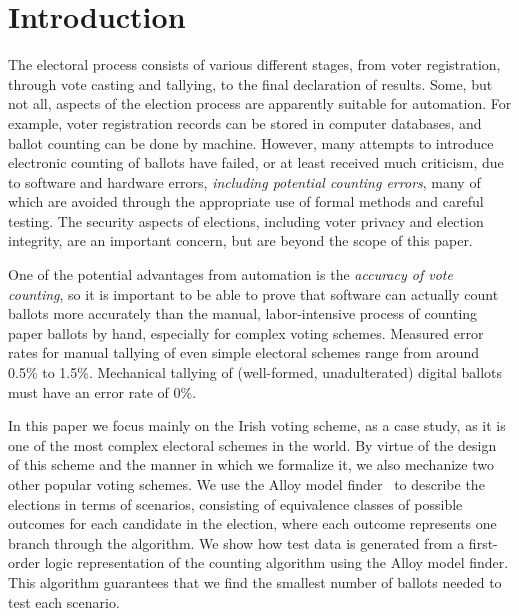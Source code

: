 \documentclass[runningheads,a4paper]{llncs}
\begin{document}
\section{Introduction}

The electoral process consists of various different stages, from voter
registration, through vote casting and tallying, to the final
declaration of results.  Some, but not all, aspects of the election
process are apparently suitable for automation.  For example, voter
registration records can be stored in computer databases, and ballot
counting can be done by machine.
However, many attempts to introduce electronic counting of ballots
have failed, or at least received much criticism, due to software and
hardware errors, \emph{including potential counting errors}, many of
which are avoided through the appropriate use of formal methods and
careful testing.  The security aspects of elections, including voter
privacy and election integrity, are an important concern, but are
beyond the scope of this paper.

One of the potential advantages from automation is the \emph{accuracy
  of vote counting}, so it is important to be able to prove that
software can actually count ballots more accurately than the manual,
labor-intensive process of counting paper ballots by hand, especially
for complex voting schemes.  Measured error rates for manual tallying
of even simple electoral schemes range from around 0.5\% to 1.5\%.
Mechanical tallying of (well-formed, unadulterated) digital ballots
must have an error rate of 0\%.

In this paper we focus mainly on the Irish voting scheme, as a case
study, as it is one of the most complex electoral schemes in the
world.  By virtue of the design of this scheme and the manner in which
we formalize it, we also mechanize two other popular voting schemes.
We use the Alloy model finder~\cite{jackson2002alloy} to describe the
elections in terms of scenarios, consisting of equivalence classes of
possible outcomes for each candidate in the election, where each
outcome represents one branch through the algorithm.  We show how test
data is generated from a first-order logic representation of the
counting algorithm using the Alloy model finder.  This algorithm
guarantees that we find the smallest number of ballots needed to test
each scenario.
\end{document}
